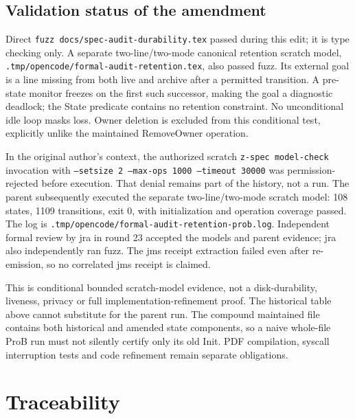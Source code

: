 \documentclass[a4paper,10pt,fleqn]{article}
\newcommand{\fpath}[1]{\nolinkurl{#1}}
\begin{document}
\subsection{Validation status of the amendment}

Direct \texttt{fuzz docs/spec-audit-durability.tex} passed during this
edit; it is type checking only. A separate two-line/two-mode canonical
retention scratch model, \fpath{.tmp/opencode/formal-audit-retention.tex},
also passed fuzz. Its external goal is a line missing from both live
and archive after a permitted transition. A pre-state monitor freezes
on the first such successor, making the goal a diagnostic deadlock;
the State predicate contains no retention constraint. No unconditional
idle loop masks loss. Owner deletion is excluded from this conditional
test, explicitly unlike the maintained RemoveOwner operation.

In the original author's context, the authorized scratch
\texttt{z-spec model-check} invocation with
\texttt{--setsize 2 --max-ops 1000 --timeout 30000} was permission-rejected
before execution. That denial remains part of the history, not a run.
The parent subsequently executed the separate two-line/two-mode scratch
model: 108 states, 1109 transitions, exit 0, with initialization and
operation coverage passed. The log is
\fpath{.tmp/opencode/formal-audit-retention-prob.log}. Independent formal
review by jra in round 23 accepted the models and parent evidence;
jra also independently ran fuzz. The jms receipt extraction failed even
after re-emission, so no correlated jms receipt is claimed.

This is conditional bounded scratch-model evidence, not a disk-durability,
liveness, privacy or full implementation-refinement proof. The historical
table above cannot substitute for the parent run. The compound maintained
file contains both historical and amended state components, so a naive
whole-file ProB run must not silently certify only its old Init. PDF
compilation, syscall interruption tests and code refinement remain
separate obligations.

\section{Traceability}
\label{sec:trace}
\end{document}
